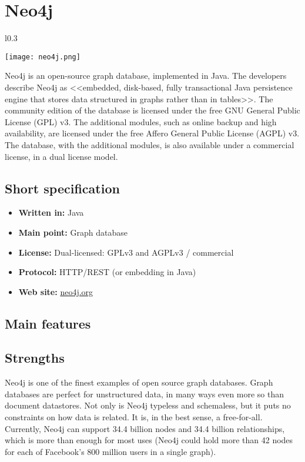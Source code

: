 \chapter{Neo4j}

\begin{wrapfigure}{l}{0.3\textwidth}
  \vspace{-75pt}
  \begin{center}
    \texttt{[image: neo4j.png]}
  \end{center}
  \vspace{-30pt}
\end{wrapfigure}
Neo4j is an open-source graph database, implemented in Java. The developers describe Neo4j as <<embedded, disk-based, fully transactional Java persistence engine that stores data structured in graphs rather than in tables>>. The community edition of the database is licensed under the free GNU General Public License (GPL) v3. The additional modules, such as online backup and high availability, are licensed under the free Affero General Public License (AGPL) v3. The database, with the additional modules, is also available under a commercial license, in a dual license model.

\section{Short specification}

\begin{itemize}
  \item \textbf{Written in:} Java
  \item \textbf{Main point:} Graph database
  \item \textbf{License:} Dual-licensed: GPLv3 and AGPLv3 / commercial
  \item \textbf{Protocol:} HTTP/REST (or embedding in Java)
  \item \textbf{Web site:} \href{http://neo4j.org/}{neo4j.org}
\end{itemize}

\section{Main features}

\section{Strengths}

Neo4j is one of the finest examples of open source graph databases. Graph databases are perfect for unstructured data, in many ways even more so than document datastores. Not only is Neo4j typeless and schemaless, but it puts no constraints on how data is related. It is, in the best sense, a free-for-all. Currently, Neo4j can support 34.4 billion nodes and 34.4 billion relationships, which is more than enough for most uses (Neo4j could hold more than 42 nodes for each of Facebook’s 800 million users in a single graph).

